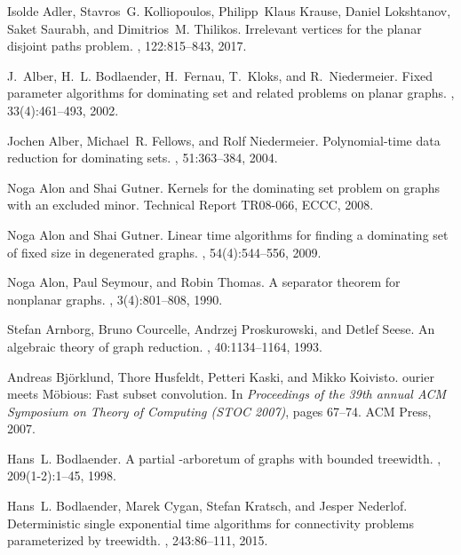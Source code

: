\documentclass[11pt]{article}
\begin{document}
\begin{thebibliography}{10}

Isolde Adler, Stavros~G. Kolliopoulos, Philipp~Klaus Krause, Daniel Lokshtanov,
  Saket Saurabh, and Dimitrios~M. Thilikos.
\newblock Irrelevant vertices for the planar disjoint paths problem.
, 122:815--843, 2017.

J.~Alber, H.~L. Bodlaender, H.~Fernau, T.~Kloks, and R.~Niedermeier.
\newblock Fixed parameter algorithms for dominating set and related problems on
  planar graphs.
, 33(4):461--493, 2002.

Jochen Alber, Michael~R. Fellows, and Rolf Niedermeier.
\newblock Polynomial-time data reduction for dominating sets.
, 51:363--384, 2004.

Noga Alon and Shai Gutner.
\newblock Kernels for the dominating set problem on graphs with an excluded
  minor.
\newblock Technical Report TR08-066, ECCC, 2008.

Noga Alon and Shai Gutner.
\newblock Linear time algorithms for finding a dominating set of fixed size in
  degenerated graphs.
, 54(4):544--556, 2009.

Noga Alon, Paul Seymour, and Robin Thomas.
\newblock A separator theorem for nonplanar graphs.
, 3(4):801--808, 1990.

Stefan Arnborg, Bruno Courcelle, Andrzej Proskurowski, and Detlef Seese.
\newblock An algebraic theory of graph reduction.
, 40:1134--1164, 1993.

Andreas Bj\"{o}rklund, Thore Husfeldt, Petteri Kaski, and Mikko Koivisto.
ourier meets {M}\"{o}bious: Fast subset convolution.
\newblock In {\em Proceedings of the 39th annual ACM Symposium on Theory of
  Computing (STOC 2007)}, pages 67--74. ACM Press, 2007.

Hans~L. Bodlaender.
\newblock A partial {}-arboretum of graphs with bounded treewidth.
, 209(1-2):1--45, 1998.

Hans~L. Bodlaender, Marek Cygan, Stefan Kratsch, and Jesper Nederlof.
\newblock Deterministic single exponential time algorithms for connectivity
  problems parameterized by treewidth.
, 243:86--111, 2015.


\end{thebibliography}
\end{document}
